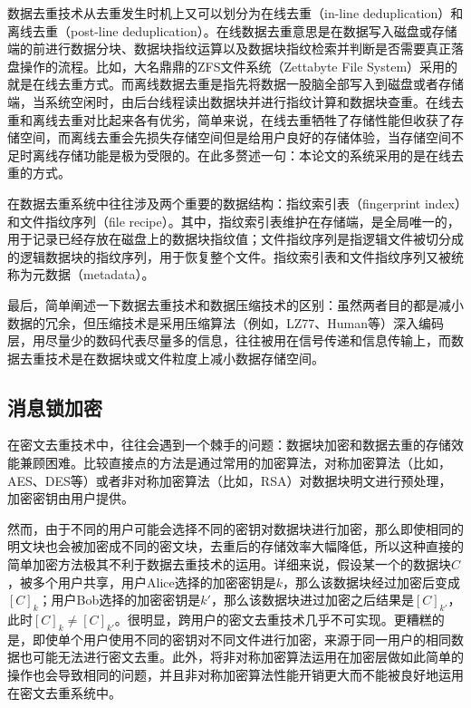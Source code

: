 \documentclass[promaster]{thesis-uestc}
\begin{document}
数据去重技术从去重发生时机上又可以划分为在线去重（in-line deduplication）和离线去重（post-line deduplication）。在线数据去重意思是在数据写入磁盘或存储端的前进行数据分块、数据块指纹运算以及数据块指纹检索并判断是否需要真正落盘操作的流程。比如，大名鼎鼎的ZFS文件系统（Zettabyte File System）采用的就是在线去重方式。而离线数据去重是指先将数据一股脑全部写入到磁盘或者存储端，当系统空闲时，由后台线程读出数据块并进行指纹计算和数据块查重。在线去重和离线去重对比起来各有优劣，简单来说，在线去重牺牲了存储性能但收获了存储空间，而离线去重会先损失存储空间但是给用户良好的存储体验，当存储空间不足时离线存储功能是极为受限的。在此多赘述一句：本论文的系统采用的是在线去重的方式。

在数据去重系统中往往涉及两个重要的数据结构：指纹索引表（fingerprint index）和文件指纹序列（file recipe）。其中，指纹索引表维护在存储端，是全局唯一的，用于记录已经存放在磁盘上的数据块指纹值；文件指纹序列是指逻辑文件被切分成的逻辑数据块的指纹序列，用于恢复整个文件。指纹索引表和文件指纹序列又被统称为元数据（metadata）。

最后，简单阐述一下数据去重技术和数据压缩技术的区别：虽然两者目的都是减小数据的冗余，但压缩技术是采用压缩算法（例如，LZ77、Human等）深入编码层，用尽量少的数码代表尽量多的信息，往往被用在信号传递和信息传输上，而数据去重技术是在数据块或文件粒度上减小数据存储空间。

\subsection{消息锁加密}\label{消息锁加密}
在密文去重技术中，往往会遇到一个棘手的问题：数据块加密和数据去重的存储效能兼顾困难。比较直接点的方法是通过常用的加密算法，对称加密算法（比如，AES、DES等）或者非对称加密算法（比如，RSA）对数据块明文进行预处理，加密密钥由用户提供。

然而，由于不同的用户可能会选择不同的密钥对数据块进行加密，那么即使相同的明文块也会被加密成不同的密文块，去重后的存储效率大幅降低，所以这种直接的简单加密方法极其不利于数据去重技术的运用。详细来说，假设某一个的数据块$C$，被多个用户共享，用户Alice选择的加密密钥是$k$，那么该数据块经过加密后变成$[C]_k$；用户Bob选择的加密密钥是$k'$，那么该数据块进过加密之后结果是$[C]_{k'}$，此时$[C]_k \neq [C]_{k'}$。很明显，跨用户的密文去重技术几乎不可实现。更糟糕的是，即使单个用户使用不同的密钥对不同文件进行加密，来源于同一用户的相同数据也可能无法进行密文去重。此外，将非对称加密算法运用在加密层做如此简单的操作也会导致相同的问题，并且非对称加密算法性能开销更大而不能被良好地运用在密文去重系统中。
\end{document}
